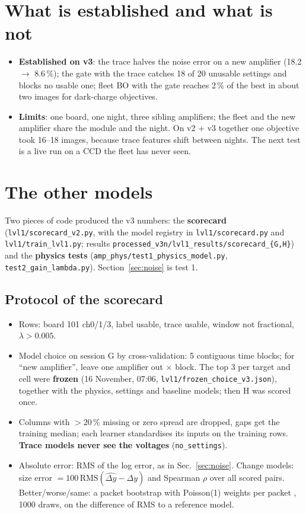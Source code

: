 \documentclass[10pt,a4paper]{article}
\newcommand{\code}[1]{\texttt{\small #1}}
\begin{document}
\section{What is established and what is not}
\begin{itemize}
\item \textbf{Established on v3}: the trace halves the noise error on a new amplifier (18.2 $\to$ 8.6\,\%); the gate with the
  trace catches 18 of 20 unusable settings and blocks no usable one; fleet BO with the gate reaches 2\,\% of the best in about
  two images for dark-charge objectives.
\item \textbf{Limits}: one board, one night, three sibling amplifiers; the fleet and the new amplifier share the module and the
  night. On v2 + v3 together one objective took 16--18 images, because trace features shift between nights. The next test is a
  live run on a CCD the fleet has never seen.
\end{itemize}

\appendix
\section{The other models}\label{app:other}

Two pieces of code produced the v3 numbers: the \textbf{scorecard} (\code{lvl1/scorecard\_v2.py}, with the model registry in
\code{lvl1/scorecard.py} and \code{lvl1/train\_lvl1.py}; results \code{processed\_v3n/lvl1\_results/scorecard\_\{G,H\}}) and the
\textbf{physics tests} (\code{amp\_phys/test1\_physics\_model.py}, \code{test2\_gain\_lambda.py}). Section~\ref{sec:noise} is test 1.

\subsection{Protocol of the scorecard}
\begin{itemize}
\item Rows: board 101 ch0/1/3, label usable, trace usable, window not fractional, $\lambda>0.005$.
\item Model choice on session G by cross-validation: 5 contiguous time blocks; for ``new amplifier'', leave one amplifier out
  $\times$ block. The top 3 per target and cell were \textbf{frozen} (16 November, 07:06,
  \code{lvl1/frozen\_choice\_v3.json}), together with the physics, settings and baseline models; then H was scored once.
\item Columns with $>20$\,\% missing or zero spread are dropped, gaps get the training median; each learner standardises its
  inputs on the training rows. \textbf{Trace models never see the voltages} (\code{no\_settings}).
\item Absolute error: RMS of the log error, as in Sec.~\ref{sec:noise}. Change models: size error $=100\,\mathrm{RMS}(\widehat{\Delta y}-\Delta y)$
  and Spearman $\rho$ over all scored pairs. Better/worse/same: a packet bootstrap with Poisson(1) weights per packet
  \cite{efron1979,hanley2006}, 1000 draws, on the difference of RMS to a reference model.
\end{itemize}
\end{document}
